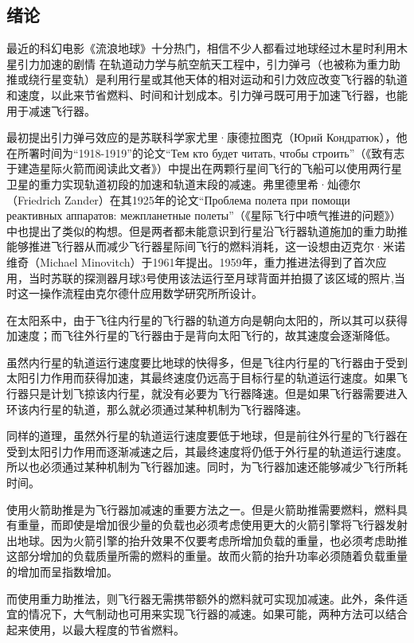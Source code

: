 \documentclass[UTF8,a4paper,10pt]{ctexart}
\begin{document}
\begin{multicols}{2}
\section{绪论}
    最近的科幻电影《流浪地球》十分热门，相信不少人都看过地球经过木星时利用木星引力加速的剧情
    在轨道动力学与航空航天工程中，引力弹弓（也被称为重力助推或绕行星变轨）是利用行星或其他天体的相对运动和引力效应改变飞行器的轨道和速度，以此来节省燃料、时间和计划成本。引力弹弓既可用于加速飞行器，也能用于减速飞行器。\par
    最初提出引力弹弓效应的是苏联科学家尤里·康德拉图克（Юрий Кондратюк），他在所署时间为“1918-1919”的论文“Тем кто будет читать, чтобы строить”（《致有志于建造星际火箭而阅读此文者》）中提出在两颗行星间飞行的飞船可以使用两行星卫星的重力实现轨道初段的加速和轨道末段的减速。弗里德里希·灿德尔（Friedrich Zander）在其1925年的论文“Проблема полета при помощи реактивных аппаратов: межпланетные полеты”（《星际飞行中喷气推进的问题》）中也提出了类似的构想。但是两者都未能意识到行星沿飞行器轨道施加的重力助推能够推进飞行器从而减少飞行器星际间飞行的燃料消耗，这一设想由迈克尔·米诺维奇（Michael Minovitch）于1961年提出。1959年，重力推进法得到了首次应用，当时苏联的探测器月球3号使用该法运行至月球背面并拍摄了该区域的照片,当时这一操作流程由克尔德什应用数学研究所所设计。\par
    在太阳系中，由于飞往内行星的飞行器的轨道方向是朝向太阳的，所以其可以获得加速度；而飞往外行星的飞行器由于是背向太阳飞行的，故其速度会逐渐降低。\par
    虽然内行星的轨道运行速度要比地球的快得多，但是飞往内行星的飞行器由于受到太阳引力作用而获得加速，其最终速度仍远高于目标行星的轨道运行速度。如果飞行器只是计划飞掠该内行星，就没有必要为飞行器降速。但是如果飞行器需要进入环该内行星的轨道，那么就必须通过某种机制为飞行器降速。\par
    同样的道理，虽然外行星的轨道运行速度要低于地球，但是前往外行星的飞行器在受到太阳引力作用而逐渐减速之后，其最终速度将仍低于外行星的轨道运行速度。所以也必须通过某种机制为飞行器加速。同时，为飞行器加速还能够减少飞行所耗时间。\par
    使用火箭助推是为飞行器加减速的重要方法之一。但是火箭助推需要燃料，燃料具有重量，而即使是增加很少量的负载也必须考虑使用更大的火箭引擎将飞行器发射出地球。因为火箭引擎的抬升效果不仅要考虑所增加负载的重量，也必须考虑助推这部分增加的负载质量所需的燃料的重量。故而火箭的抬升功率必须随着负载重量的增加而呈指数增加。\par
    而使用重力助推法，则飞行器无需携带额外的燃料就可实现加减速。此外，条件适宜的情况下，大气制动也可用来实现飞行器的减速。如果可能，两种方法可以结合起来使用，以最大程度的节省燃料。\par

\end{multicols}
\end{document}
